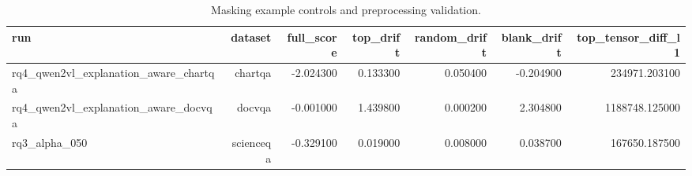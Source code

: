 \begin{table}
\caption{Masking example controls and preprocessing validation.}
\label{tab:masking_examples}
\begin{tabular}{lrrrrrr}
\toprule
run & dataset & full_score & top_drift & random_drift & blank_drift & top_tensor_diff_l1 \\
\midrule
rq4_qwen2vl_explanation_aware_chartqa & chartqa & -2.024300 & 0.133300 & 0.050400 & -0.204900 & 234971.203100 \\
rq4_qwen2vl_explanation_aware_docvqa & docvqa & -0.001000 & 1.439800 & 0.000200 & 2.304800 & 1188748.125000 \\
rq3_alpha_050 & scienceqa & -0.329100 & 0.019000 & 0.008000 & 0.038700 & 167650.187500 \\
\bottomrule
\end{tabular}
\end{table}

